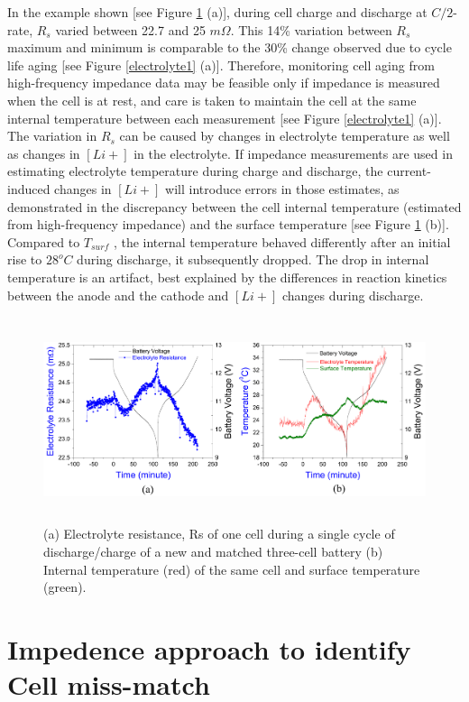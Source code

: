 \vspace{0.5cm}
In the example shown [see Figure \ref{electrolyte2} (a)], during cell charge and discharge at $C/2$-rate, $R_s$ varied between 22.7 and 25 $m\Omega$. This 14\% variation between $R_s$ maximum and minimum is comparable to the 30\% change observed due to cycle life aging [see Figure \ref{electrolyte1} (a)]. Therefore, monitoring cell aging from high-frequency impedance data may be feasible only if impedance is measured when the cell is at rest, and care is taken to maintain the cell at the same internal temperature between each measurement [see Figure \ref{electrolyte1} (a)]. The variation in $R_s$ can be caused by changes in electrolyte temperature as well as changes in $[Li+]$ in the electrolyte. If impedance measurements are used in estimating electrolyte temperature during charge and discharge, the current-induced changes in $[Li+]$ will introduce errors in those estimates, as demonstrated in the discrepancy between the cell internal temperature (estimated from high-frequency impedance) and the surface temperature [see Figure \ref{electrolyte2} (b)]. Compared to $T_{surf}$ , the internal temperature behaved differently after an initial rise to $28^oC$ during discharge, it subsequently dropped. The drop in internal temperature is an artifact, best explained by the differences in reaction kinetics between the anode and the cathode and $[Li+]$ changes during discharge.

\begin{figure}[H]
	\includegraphics[width=16cm,height=6cm]{figures/electrolyte2}
	\centering
	\caption{
		(a) Electrolyte resistance, Rs of one cell during a single cycle of discharge{/}charge of a new and matched three-cell battery (b) Internal temperature (red) of the same cell and surface temperature (green).} \label{electrolyte2}
\end{figure}

\section{Impedence approach to identify Cell miss-match}

